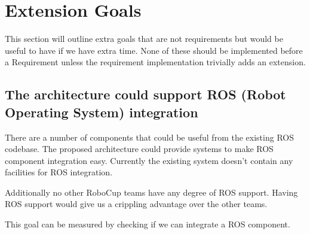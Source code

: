 \documentclass[english,12pt]{scrartcl}
\begin{document}
    \section{Extension Goals}
        This section will outline extra goals that are not requirements but would be useful to have
        if we have extra time. None of these should be implemented before a Requirement unless the
        requirement implementation trivially adds an extension.
        
        \subsection{The architecture could support ROS (Robot Operating System) integration}
            There are a number of components that could be useful from the existing ROS codebase.
            The proposed architecture could provide systems to make ROS component integration easy.
            Currently the existing system doesn't contain any facilities for ROS integration.
            
            Additionally no other RoboCup teams have any degree of ROS support. Having ROS support
            would give us a crippling advantage over the other teams. 
            
            This goal can be measured by checking if we can integrate a ROS component.
            
            
   	
    
\end{document}
